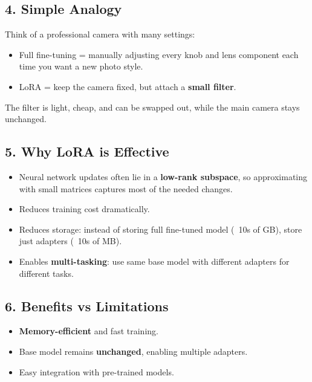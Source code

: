 \documentclass[a4paper, 12pt]{article}
\begin{document}
\subsection*{4. Simple Analogy}
\begin{tcolorbox}[colback=green!5!white,colframe=green!75!black,title=Analogy]
Think of a professional camera with many settings:

\begin{itemize}
    \item Full fine-tuning = manually adjusting every knob and lens component each time you want a new photo style.
    \item LoRA = keep the camera fixed, but attach a \textbf{small filter}. 
\end{itemize}

The filter is light, cheap, and can be swapped out, while the main camera stays unchanged.
\end{tcolorbox}

\subsection*{5. Why LoRA is Effective}
\begin{itemize}
    \item Neural network updates often lie in a \textbf{low-rank subspace}, so approximating with small matrices captures most of the needed changes.
    \item Reduces training cost dramatically.
    \item Reduces storage: instead of storing full fine-tuned model (~10s of GB), store just adapters (~10s of MB).
    \item Enables \textbf{multi-tasking}: use same base model with different adapters for different tasks.
\end{itemize}

\subsection*{6. Benefits vs Limitations}
\begin{tcolorbox}[colback=blue!5!white,colframe=blue!75!black,title=Pros]
\begin{itemize}
    \item \textbf{Memory-efficient} and fast training.
    \item Base model remains \textbf{unchanged}, enabling multiple adapters.
    \item Easy integration with pre-trained models.
\end{itemize}
\end{tcolorbox}
\end{document}
